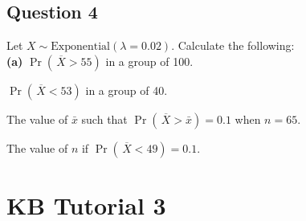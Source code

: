 



\subsection*{Question 4}
Let $X \sim \text{Exponential}(\lambda=0.02)$. Calculate the following:\\[-0.2cm]

{\bf(a)} $\Pr(\,\overline{\!X} > 55)$ in a group of 100. 
 \item  $\Pr(\,\overline{\!X} < 53)$ in a group of 40. 
 \item  The value of $\bar x$ such that $\Pr(\,\overline{\!X} > \bar x) = 0.1$ when $n=65$. 
 \item  The value of $n$ if $\Pr(\,\overline{\!X} < 49) = 0.1$.



\section{KB Tutorial 3}
